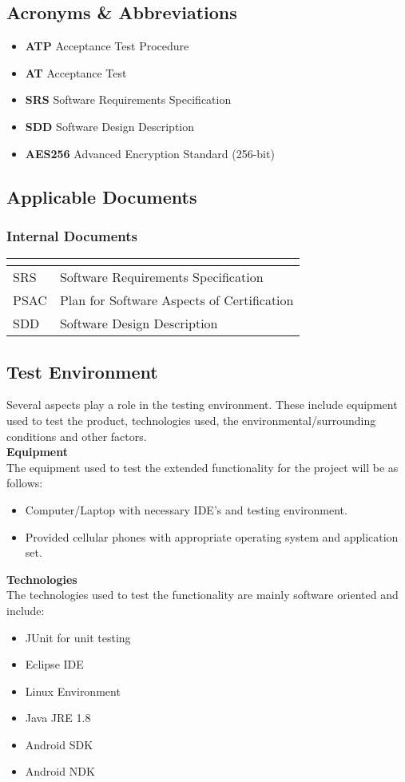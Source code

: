\documentclass[11pt]{article}
\begin{document}
\subsection{Acronyms \& Abbreviations}
\begin{itemize}
\item \textbf{ATP} Acceptance Test Procedure
\item \textbf{AT} Acceptance Test
\item \textbf{SRS} Software Requirements Specification
\item \textbf{SDD} Software Design Description
\item \textbf{AES256} Advanced Encryption Standard (256-bit)
\end{itemize}
\subsection{Applicable Documents}
\subsubsection{Internal Documents}
\begin{tabular}{ll}
\textbf{}       & \textbf{}  \\ \hline
\multicolumn{1}{|L{2cm}|}{SRS} & \multicolumn{1}{L{10cm}|}{Software Requirements Specification} \\ \hline
\multicolumn{1}{|L{2cm}|}{PSAC} & \multicolumn{1}{L{10cm}|}{Plan for Software Aspects of Certification} \\ \hline
\multicolumn{1}{|L{2cm}|}{SDD} & \multicolumn{1}{L{10cm}|}{Software Design Description} \\ \hline
\end{tabular}

\subsection{Test Environment}
Several aspects play a role in the testing environment. These include equipment used to test the product, technologies used, the environmental/surrounding conditions and other factors.\\
\textbf{Equipment}\\
The equipment used to test the extended functionality for the project will be as follows:
\begin{itemize}
\item Computer/Laptop with necessary IDE's and testing environment.
\item Provided cellular phones with appropriate operating system and application set.
\end{itemize}
\textbf{Technologies}\\
The technologies used to test the functionality are mainly software oriented and include:
\begin{itemize}
\item JUnit for unit testing
\item Eclipse IDE
\item Linux Environment
\item Java JRE 1.8
\item Android SDK
\item Android NDK
\end{itemize}
\end{document}
